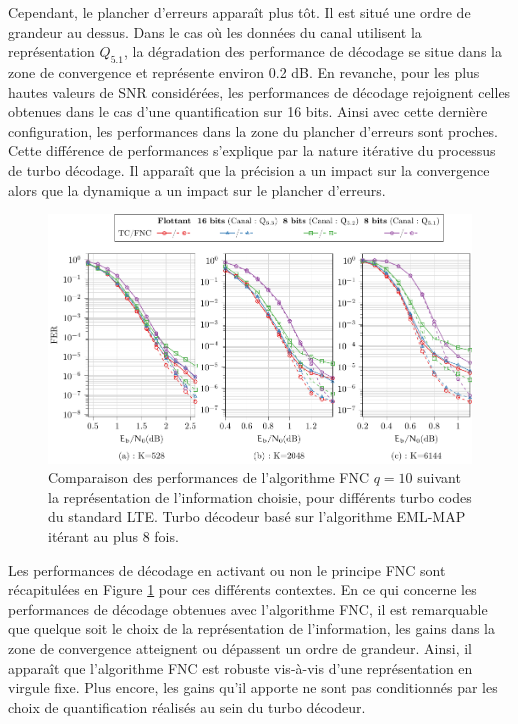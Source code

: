 Cependant, le plancher d'erreurs apparaît plus tôt. Il est situé une ordre de grandeur au dessus. Dans le cas où les 
données du canal utilisent la représentation $Q_{5.1}$, la dégradation des performance de décodage se situe dans la zone 
de convergence et représente environ 0.2 dB. En revanche, pour 
les plus hautes valeurs de SNR considérées, les performances de décodage rejoignent celles obtenues dans le cas d'une 
quantification sur 16 bits. Ainsi avec cette dernière configuration, les performances dans la zone du plancher 
d'erreurs sont proches. Cette différence de performances s'explique par la nature itérative du processus de turbo 
décodage. Il apparaît que la précision a un impact sur la convergence alors que la dynamique a un impact sur le plancher d'erreurs.

\begin{figure}[!t]
	\centering
	\hspace*{-.1\textwidth}
	\includegraphics[width=1.1\textwidth]{main/ch4_fig/final/tikz_last/fnc10_format_refs_3.pdf}
	\caption{Comparaison des performances de l'algorithme FNC $q=10$ 
	suivant la représentation de l'information choisie, pour différents turbo codes du standard LTE.
	Turbo décodeur basé sur l'algorithme EML-MAP itérant au plus 8 fois.
	\label{fig:fnc_format_refs}}
	\vspace*{-1ex}
\end{figure}

Les performances de décodage en activant ou non le principe FNC sont récapitulées en Figure \ref{fig:fnc_format_refs} pour
ces différents contextes. 
En ce qui concerne les performances de décodage obtenues avec l'algorithme FNC, il est remarquable que quelque soit le 
choix de la représentation de l'information, les gains dans la zone de convergence atteignent ou dépassent un ordre de 
grandeur. Ainsi, il apparaît que l'algorithme FNC est robuste vis-à-vis d'une représentation en virgule fixe. Plus encore, les
gains qu'il apporte ne sont pas conditionnés par les choix de quantification réalisés au sein du turbo décodeur.

